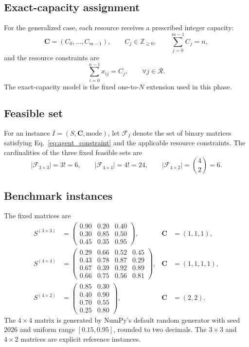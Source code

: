 \subsection{Exact-capacity assignment}

For the generalized case, each resource receives a prescribed integer capacity:
\begin{equation}
\bm C=(C_0,\ldots,C_{m-1}),\qquad C_j\in\mathbb Z_{\geq0},
\qquad \sum_{j=0}^{m-1}C_j=n,
\end{equation}
and the resource constraints are
\begin{equation}
\sum_{i=0}^{n-1}x_{ij}=C_j,
\qquad \forall j\in\mathcal R.
\label{eq:capacity_constraint}
\end{equation}
The exact-capacity model is the fixed one-to-$N$ extension used in this phase.

\subsection{Feasible set}

For an instance $I=(S,\bm C,\text{mode})$, let $\mathcal F_I$ denote the set of binary matrices satisfying Eq.~\eqref{eq:agent_constraint} and the applicable resource constraints. The cardinalities of the three fixed feasible sets are
\begin{equation}
|\mathcal F_{3\times3}|=3!=6,
\qquad
|\mathcal F_{4\times4}|=4!=24,
\qquad
|\mathcal F_{4\times2}|=\binom{4}{2}=6.
\end{equation}

\subsection{Benchmark instances}

The fixed matrices are
\begin{align}
S^{(3\times3)}&=
\begin{pmatrix}
0.90&0.20&0.40\\
0.30&0.85&0.50\\
0.45&0.35&0.95
\end{pmatrix},
&\bm C&=(1,1,1),
\label{eq:S33}\\[0.5em]
S^{(4\times4)}&=
\begin{pmatrix}
0.29&0.66&0.52&0.45\\
0.43&0.78&0.87&0.29\\
0.67&0.39&0.92&0.89\\
0.66&0.75&0.56&0.81
\end{pmatrix},
&\bm C&=(1,1,1,1),
\label{eq:S44}\\[0.5em]
S^{(4\times2)}&=
\begin{pmatrix}
0.85&0.30\\
0.40&0.90\\
0.70&0.55\\
0.25&0.80
\end{pmatrix},
&\bm C&=(2,2).
\label{eq:S42}
\end{align}
The $4\times4$ matrix is generated by NumPy's default random generator with seed 2026 and uniform range $[0.15,0.95]$, rounded to two decimals. The $3\times3$ and $4\times2$ matrices are explicit reference instances.

